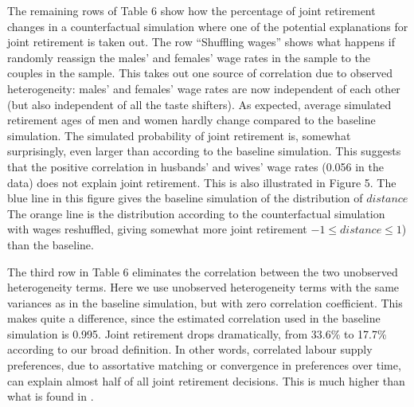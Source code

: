 \documentclass[11pt,letter]{article}
\begin{document}
The remaining rows of Table 6 show how the percentage of joint retirement changes in a counterfactual simulation where one of the potential explanations for joint retirement is taken out. The row ``Shuffling wages'' shows what happens if randomly reassign the males' and females' wage rates in the sample to the couples in the sample. This takes out one source of correlation due to observed heterogeneity: males' and females' wage rates are now independent of each other (but also independent of all the taste shifters). As expected, average simulated retirement ages of men and women hardly change compared to the baseline simulation. The simulated probability of joint retirement is, somewhat surprisingly, even larger than according to the baseline simulation. This suggests that the positive correlation in husbands' and wives' wage rates (0.056 in the data) does not explain joint retirement. This is also illustrated in Figure 5. The blue line in this figure gives the baseline simulation of the distribution of $distance$ The orange line is the distribution according to the counterfactual simulation with wages reshuffled, giving somewhat more joint retirement $-1 \leq distance \leq 1$) than the baseline.

The third row in Table 6 eliminates the correlation between the two unobserved heterogeneity terms. Here we use unobserved heterogeneity terms with the same variances as in the baseline simulation, but with zero correlation coefficient. This makes quite a difference, since the estimated correlation used in the baseline simulation is 0.995. Joint retirement drops dramatically, from 33.6\% to 17.7\% according to our broad definition. In other words, correlated labour supply preferences, due to assortative matching or convergence in preferences over time, can explain almost half of all joint retirement decisions. This is much higher than what is found in \citet{gustman2000retirement,gustman2004}. %
\end{document}
